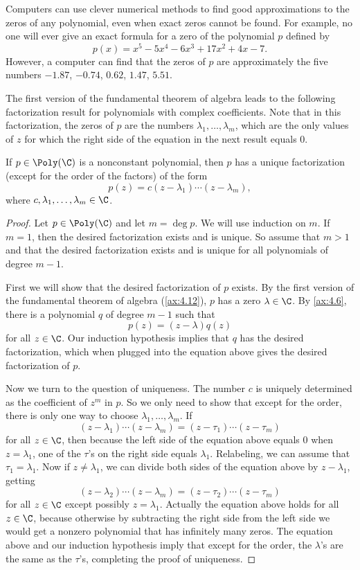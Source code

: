 Computers can use clever numerical methods to find good approximations to the
zeros of any polynomial, even when exact zeros cannot be found. For example, no
one will ever give an exact formula for a zero of the polynomial $p$ defined by
\[ p(x) = x^5-5x^4-6x^3+17x^2+4x-7. \]
However, a computer can find that the zeros of $p$ are approximately the five
numbers $-1.87$, $-0.74$, $0.62$, $1.47$, $5.51$.

The first version of the fundamental theorem of algebra leads to the following
factorization result for polynomials with complex coefficients. Note that in
this factorization, the zeros of $p$ are the numbers $\lambda_1,\dots,\lambda_m$,
which are the only values of $z$ for which the right side of the equation in the
next result equals $0$.

\begin{result}\label{ax:4.13}
If $p\in\Poly(\C)$ is a nonconstant polynomial, then $p$ has a unique
factorization (except for the order of the factors) of the form
\[ p(z) = c(z-\lambda_1)\cdots(z-\lambda_m), \]
where $c,\lambda_1,\dots,\lambda_m\in\C$.
\end{result}

\begin{proof}
Let $p\in\Poly(\C)$ and let $m=\deg p$. We will use induction on $m$. If
$m=1$, then the desired factorization exists and is unique. So assume that
$m>1$ and that the desired factorization exists and is unique for all
polynomials of degree $m-1$.

First we will show that the desired factorization of $p$ exists. By the first
version of the fundamental theorem of algebra (\ref{ax:4.12}), $p$ has a zero
$\lambda\in\C$. By \ref{ax:4.6}, there is a polynomial $q$ of degree $m-1$ such
that
\[ p(z) = (z-\lambda)q(z) \]
for all $z\in\C$. Our induction hypothesis implies that $q$ has the desired
factorization, which when plugged into the equation above gives the desired
factorization of $p$.

Now we turn to the question of uniqueness. The number $c$ is uniquely
determined as the coefficient of $z^m$ in $p$. So we only need to show that
except for the order, there is only one way to choose
$\lambda_1,\dots,\lambda_m$. If
\[ (z-\lambda_1)\cdots(z-\lambda_m) = (z-\tau_1)\cdots(z-\tau_m) \]
for all $z\in\C$, then because the left side of the equation above equals $0$
when $z=\lambda_1$, one of the $\tau$'s on the right side equals $\lambda_1$.
Relabeling, we can assume that $\tau_1=\lambda_1$. Now if $z\ne\lambda_1$, we
can divide both sides of the equation above by $z-\lambda_1$, getting
\[ (z-\lambda_2)\cdots(z-\lambda_m) = (z-\tau_2)\cdots(z-\tau_m) \]
for all $z\in\C$ except possibly $z=\lambda_1$. Actually the equation above
holds for all $z\in\C$, because otherwise by subtracting the right side from
the left side we would get a nonzero polynomial that has infinitely many zeros.
The equation above and our induction hypothesis imply that except for the
order, the $\lambda$'s are the same as the $\tau$'s, completing the proof of
uniqueness.
\end{proof}


